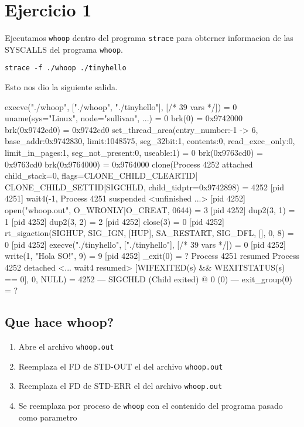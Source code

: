
\section{Ejercicio 1}

Ejecutamos \verb|whoop| dentro del programa \verb|strace| para obterner informacion de las SYSCALLS del programa \verb|whoop|.

\begin{framed}
\begin{verbatim}
strace -f ./whoop ./tinyhello
\end{verbatim}
\end{framed}

Esto nos dio la siguiente salida.

\begin{framed}
\begin{verbatimtab}
execve("./whoop", ["./whoop", "./tinyhello"], [/* 39 vars */]) = 0
uname({sys="Linux", node="sullivan", ...}) = 0
brk(0)                                  = 0x9742000
brk(0x9742cd0)                          = 0x9742cd0
set_thread_area({entry_number:-1 -> 6, base_addr:0x9742830, limit:1048575, 
  seg_32bit:1, contents:0, read_exec_only:0, limit_in_pages:1, 
  seg_not_present:0, useable:1}) = 0
brk(0x9763cd0)                          = 0x9763cd0
brk(0x9764000)                          = 0x9764000
clone(Process 4252 attached child_stack=0, flags=CLONE_CHILD_CLEARTID|
  CLONE_CHILD_SETTID|SIGCHLD, child_tidptr=0x9742898) = 4252
[pid  4251] wait4(-1, Process 4251 suspended
 <unfinished ...>
[pid  4252] open("whoop.out", O_WRONLY|O_CREAT, 0644) = 3
[pid  4252] dup2(3, 1)                  = 1
[pid  4252] dup2(3, 2)                  = 2
[pid  4252] close(3)                    = 0
[pid  4252] rt_sigaction(SIGHUP, {SIG_IGN, [HUP], SA_RESTART}, 
  {SIG_DFL, [], 0}, 8) = 0
[pid  4252] execve("./tinyhello", ["./tinyhello"], [/* 39 vars */]) = 0
[pid  4252] write(1, "Hola SO!\n", 9)   = 9
[pid  4252] _exit(0)                    = ?
Process 4251 resumed
Process 4252 detached
<... wait4 resumed> [{WIFEXITED(s) && WEXITSTATUS(s) == 0}], 0, NULL) = 4252
--- SIGCHLD (Child exited) @ 0 (0) ---
exit_group(0)                           = ?
\end{verbatimtab}
\end{framed}

\subsection{Que hace whoop?}

\begin{enumerate}
 \item Abre el archivo \verb|whoop.out|
 \item Reemplaza el FD de STD-OUT el del archivo \verb|whoop.out|
 \item Reemplaza el FD de STD-ERR el del archivo \verb|whoop.out|
 \item Se reemplaza por proceso de \verb|whoop| con el contenido del programa pasado como parametro
\end{enumerate}

